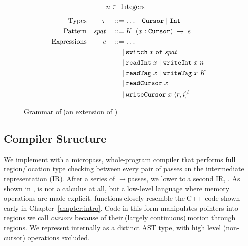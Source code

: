 \documentclass[showabstract,showacknowledgments,showpreface,showdedication]{iuphd}
\theoremstyle{nonumberplain}
\begin{document}
\begin{figure}
  \begin{displaymath}
    \begin{aligned}
      &n \in \; \textup{Integers}
    \end{aligned}
  \end{displaymath}
  \begin{displaymath}
    \begin{aligned}
      \textup{Types} && \mathit{\tau} && \; ::= \; & \ldots \; | \; \texttt{Cursor} \; | \; \texttt{Int} \\
      \textup{Pattern} && \mathit{spat} && \; ::= \; & \mathit{K} \; \;(x : \texttt{Cursor}) \;\rightarrow \;\mathit{e} \\
      \textup{Expressions} && \mathit{e} && \; ::= \; & \dots \\
      && && \; | \; & \texttt{switch}\; x \;\texttt{of}\;\mathit{spat}\\
      && && \; | \; & \texttt{\text{readInt}} \; x \; | \; \texttt{\text{writeInt}} \; x \; n \\
      && && \; | \; & \texttt{\text{readTag}} \; x \; | \; \texttt{\text{writeTag}} \; x \; \mathit{K} \\
      && && \; | \; & \texttt{\text{readCursor}} \; x \\
      && && \; | \; & \texttt{\text{writeCursor}} \; x \; \langle r, i \rangle ^{l} \\
    \end{aligned}
  \end{displaymath}
  \normalsize
  \caption{{Grammar of \lamcur{} (an extension of \ourcalc{}) \captionscrunch}}
  \label{fig:nocal-grammar}
\end{figure}

\subsection{Compiler Structure}\label{subsec:compiler_structure}
We implement \ourcalc with a micropass, whole-program compiler that performs
full region/location type checking
between every pair of passes on the \ourcalc intermediate representation (IR).
%
%
After a series of \ourcalc$\rightarrow$\ourcalc passes, we lower to a second IR,
\emph{\lamcur}.
As shown in ,
\lamcur is not a calculus at all, but a low-level language where
memory operations are made explicit.  \lamcur{} functions closely resemble the C++
code shown early in Chapter~\ref{chapter:intro}. 
%
Code in this form manipulates pointers into regions we call {\em cursors} because of
their (largely continuous) motion through regions.
%
{We represent \lamcur internally as a
  distinct AST type, with high level (non-cursor) operations excluded.}
\end{document}
